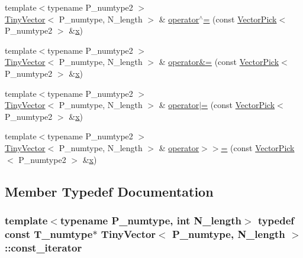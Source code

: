 \begin{DoxyCompactItemize}
{\footnotesize template$<$typename P\+\_\+numtype2 $>$ }\\\hyperlink{classTinyVector}{Tiny\+Vector}$<$ P\+\_\+numtype, N\+\_\+length $>$ \& \hyperlink{classTinyVector_af9dfd771f01100fb1822da854cdfe257}{operator$^\wedge$=} (const \hyperlink{classVectorPick}{Vector\+Pick}$<$ P\+\_\+numtype2 $>$ \&\hyperlink{vecnorm1_8cc_ac73eed9e41ec09d58f112f06c2d6cb63}{x})
\item 
{\footnotesize template$<$typename P\+\_\+numtype2 $>$ }\\\hyperlink{classTinyVector}{Tiny\+Vector}$<$ P\+\_\+numtype, N\+\_\+length $>$ \& \hyperlink{classTinyVector_ad37bb639bcbe4c8956fecbe01086105c}{operator\&=} (const \hyperlink{classVectorPick}{Vector\+Pick}$<$ P\+\_\+numtype2 $>$ \&\hyperlink{vecnorm1_8cc_ac73eed9e41ec09d58f112f06c2d6cb63}{x})
\item 
{\footnotesize template$<$typename P\+\_\+numtype2 $>$ }\\\hyperlink{classTinyVector}{Tiny\+Vector}$<$ P\+\_\+numtype, N\+\_\+length $>$ \& \hyperlink{classTinyVector_a4049a9ba0b45ab88e6df72f1b40f91d8}{operator$\vert$=} (const \hyperlink{classVectorPick}{Vector\+Pick}$<$ P\+\_\+numtype2 $>$ \&\hyperlink{vecnorm1_8cc_ac73eed9e41ec09d58f112f06c2d6cb63}{x})
\item 
{\footnotesize template$<$typename P\+\_\+numtype2 $>$ }\\\hyperlink{classTinyVector}{Tiny\+Vector}$<$ P\+\_\+numtype, N\+\_\+length $>$ \& \hyperlink{classTinyVector_add58883bb88905f27d23a245065c96bf}{operator$>$$>$=} (const \hyperlink{classVectorPick}{Vector\+Pick}$<$ P\+\_\+numtype2 $>$ \&\hyperlink{vecnorm1_8cc_ac73eed9e41ec09d58f112f06c2d6cb63}{x})
\end{DoxyCompactItemize}


\subsection{Member Typedef Documentation}
\hypertarget{classTinyVector_a58fc9319708794276cdad6399cf03eed}{}
\subsubsection[{const\+\_\+iterator}]{\setlength{\rightskip}{0pt plus 5cm}template$<$typename P\+\_\+numtype, int N\+\_\+length$>$ typedef const {\bf T\+\_\+numtype}$\ast$ {\bf Tiny\+Vector}$<$ P\+\_\+numtype, N\+\_\+length $>$\+::{\bf const\+\_\+iterator}}\label{classTinyVector_a58fc9319708794276cdad6399cf03eed}
\hypertarget{classTinyVector_a7e1e065c0b894add536ab278dfe28202}{}
